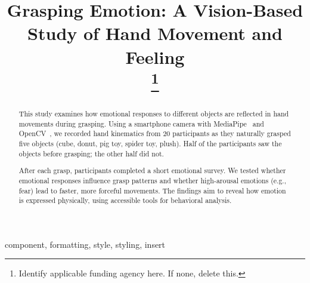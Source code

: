 \documentclass[conference]{IEEEtran}
\begin{document}
\title{Grasping Emotion: A Vision-Based Study of Hand Movement and Feeling\\

\thanks{Identify applicable funding agency here. If none, delete this.}
}

\author{
\and
{}
\and
{}
}

\maketitle

\begin{abstract}
This study examines how emotional responses to different objects are reflected in hand movements during grasping. Using a smartphone camera with MediaPipe~\cite{mediapipe2019} and OpenCV~\cite{opencv2015}, we recorded hand kinematics from 20 participants as they naturally grasped five objects (cube, donut, pig toy, spider toy, plush). Half of the participants saw the objects before grasping; the other half did not.

After each grasp, participants completed a short emotional survey. We tested whether emotional responses influence grasp patterns and whether high-arousal emotions (e.g., fear) lead to faster, more forceful movements. The findings aim to reveal how emotion is expressed physically, using accessible tools for behavioral analysis.
\end{abstract}

\begin{IEEEkeywords}
component, formatting, style, styling, insert
\end{IEEEkeywords}
\end{document}

